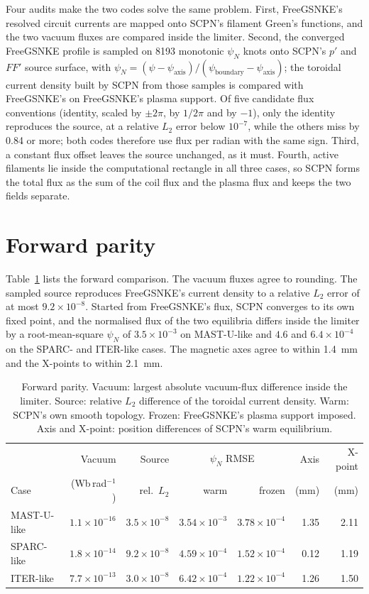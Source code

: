 \documentclass[11pt]{article}
\begin{document}
Four audits make the two codes solve the same problem.  First, FreeGSNKE's
resolved circuit currents are mapped onto SCPN's filament Green's functions,
and the two vacuum fluxes are compared inside the limiter.  Second, the
converged FreeGSNKE profile is sampled on 8193 monotonic $\psi_N$ knots onto
SCPN's $p'$ and $FF'$ source surface, with $\psi_N = (\psi -
\psi_\mathrm{axis})/(\psi_\mathrm{boundary} - \psi_\mathrm{axis})$; the toroidal
current density built by SCPN from those samples is compared with FreeGSNKE's
on FreeGSNKE's plasma support.  Of five candidate flux conventions (identity,
scaled by $\pm 2\pi$, by $1/2\pi$ and by $-1$), only the identity reproduces the
source, at a relative $L_2$ error below $10^{-7}$, while the others miss by
0.84 or more; both codes therefore use flux per radian with the same sign.
Third, a constant flux offset leaves the source unchanged, as it must.  Fourth,
active filaments lie inside the computational rectangle in all three cases, so
SCPN forms the total flux as the sum of the coil flux and the plasma flux and
keeps the two fields separate.

\section{Forward parity}

Table~\ref{tab:forward} lists the forward comparison.  The vacuum fluxes agree
to rounding.  The sampled source reproduces FreeGSNKE's current density to a
relative $L_2$ error of at most $9.2 \times 10^{-8}$.  Started from FreeGSNKE's
flux, SCPN converges to its own fixed point, and the normalised flux of the two
equilibria differs inside the limiter by a root-mean-square $\psi_N$ of
$3.5 \times 10^{-3}$ on MAST-U-like and $4.6$ and $6.4 \times 10^{-4}$ on the
SPARC- and ITER-like cases.  The magnetic axes agree to within 1.4~mm and the
X-points to within 2.1~mm.

\begin{table}[ht]
\centering
\caption{Forward parity.  Vacuum: largest absolute vacuum-flux difference
inside the limiter.  Source: relative $L_2$ difference of the toroidal current
density.  Warm: SCPN's own smooth topology.  Frozen: FreeGSNKE's plasma
support imposed.  Axis and X-point: position differences of SCPN's warm
equilibrium.}
\label{tab:forward}
\begin{tabular}{lrrrrrr}
\toprule
 & Vacuum & Source & \multicolumn{2}{c}{$\psi_N$ RMSE} & Axis & X-point \\
Case & (Wb\,rad$^{-1}$) & rel.\ $L_2$ & warm & frozen & (mm) & (mm) \\
\midrule
MAST-U-like & $1.1 \times 10^{-16}$ & $3.5 \times 10^{-8}$ & $3.54 \times 10^{-3}$ & $3.78 \times 10^{-4}$ & 1.35 & 2.11 \\
SPARC-like & $1.8 \times 10^{-14}$ & $9.2 \times 10^{-8}$ & $4.59 \times 10^{-4}$ & $1.52 \times 10^{-4}$ & 0.12 & 1.19 \\
ITER-like & $7.7 \times 10^{-13}$ & $3.0 \times 10^{-8}$ & $6.42 \times 10^{-4}$ & $1.22 \times 10^{-4}$ & 1.26 & 1.50 \\
\bottomrule
\end{tabular}
\end{table}
\end{document}

